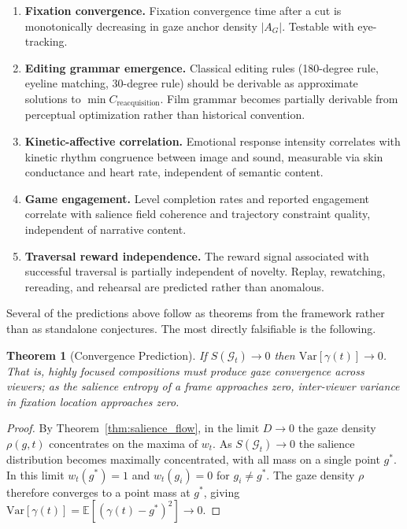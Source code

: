 \documentclass[12pt, a4paper]{article}
\theoremstyle{plain}
\newtheorem{theorem}{Theorem}[section]
\theoremstyle{definition}
\theoremstyle{remark}
\newcommand{\G}{\mathcal{G}}
\newcommand{\traj}{\gamma}
\newcommand{\AG}{A_G}
\newcommand{\salience}{w}
\begin{document}
\begin{enumerate}

  \item \textbf{Fixation convergence.} Fixation convergence
  time after a cut is monotonically decreasing in gaze
  anchor density $|\AG|$. Testable with eye-tracking.

  \item \textbf{Editing grammar emergence.} Classical editing
  rules (180-degree rule, eyeline matching, 30-degree rule)
  should be derivable as approximate solutions to
  $\min C_{\text{reacquisition}}$. Film grammar becomes
  partially derivable from perceptual optimization rather
  than historical convention.

  \item \textbf{Kinetic-affective correlation.} Emotional
  response intensity correlates with kinetic rhythm
  congruence between image and sound, measurable via skin
  conductance and heart rate, independent of semantic content.

  \item \textbf{Game engagement.} Level completion rates and
  reported engagement correlate with salience field coherence
  and trajectory constraint quality, independent of narrative
  content.

  \item \textbf{Traversal reward independence.} The reward
  signal associated with successful traversal is partially
  independent of novelty. Replay, rewatching, rereading, and
  rehearsal are predicted rather than anomalous.

\end{enumerate}

Several of the predictions above follow as theorems from
the framework rather than as standalone conjectures.
The most directly falsifiable is the following.

\begin{theorem}[Convergence Prediction]
\label{thm:convergence}
  If $S(\G_t) \to 0$ then
  $\mathrm{Var}[\traj(t)] \to 0$.
  That is, highly focused compositions must produce gaze
  convergence across viewers; as the salience entropy of a
  frame approaches zero, inter-viewer variance in fixation
  location approaches zero.
\end{theorem}

\begin{proof}
  By Theorem~\ref{thm:salience_flow}, in the limit $D \to
  0$ the gaze density $\rho(g,t)$ concentrates on the
  maxima of $\salience_t$. As $S(\G_t) \to 0$ the salience
  distribution becomes maximally concentrated, with all
  mass on a single point $g^\ast$. In this limit
  $\salience_t(g^\ast) = 1$ and $\salience_t(g_i) = 0$
  for $g_i \neq g^\ast$. The gaze density $\rho$ therefore
  converges to a point mass at $g^\ast$, giving
  $\mathrm{Var}[\traj(t)] = \mathbb{E}[(\traj(t) -
  g^\ast)^2] \to 0$.
\end{proof}
\end{document}
